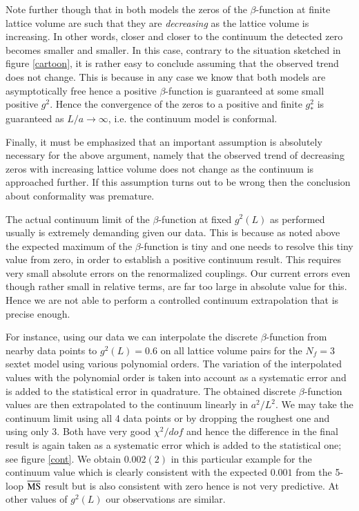 \documentclass[epj]{webofc}
\def\msbar{\overline{\rm MS\kern-0.5pt}\kern0.5pt}
\begin{document}
Note further though that in both models the zeros of the $\beta$-function at finite lattice volume are such that they
are {\em decreasing} as the lattice volume is increasing. In other words, closer and closer to the continuum the
detected zero becomes smaller and smaller. In this case, contrary to the situation sketched in figure \ref{cartoon}, it
is rather easy to conclude assuming that the observed trend does not change. This is because in any case we know that
both models are asymptotically free hence a positive $\beta$-function is guaranteed at some small positive $g^2$. Hence
the convergence of the zeros to a positive and finite $g_*^2$ is guaranteed as $L/a \to \infty$, i.e. the continuum
model is conformal.

Finally, it must be emphasized that an important assumption is absolutely necessary for the above argument, namely that
the observed trend of decreasing zeros with increasing lattice volume does not change as the continuum is approached
further. If this assumption turns out to be wrong then the conclusion about conformality was premature. 

The actual continuum limit of the $\beta$-function at fixed $g^2(L)$ as performed usually is extremely demanding given
our data. This is because as noted above the expected maximum of the $\beta$-function is tiny and one needs to resolve
this tiny value from zero, in order to establish a positive continuum result. This requires very small absolute errors
on the renormalized couplings. Our current errors even though rather small in relative terms, are far too large in
absolute value for this. Hence we are not able to perform a controlled continuum extrapolation that is precise enough. 

For instance, using our data we can interpolate the discrete $\beta$-function from nearby data points 
to $g^2(L) = 0.6$ on all lattice volume pairs for the $N_f = 3$ sextet model using various polynomial orders. The
variation of the interpolated values with the polynomial order is taken into account as a systematic error
and is added to the statistical error in quadrature. The obtained discrete $\beta$-function values are then extrapolated
to the continuum linearly in $a^2/L^2$. 
We may take the continuum limit using all 4 data points or by
dropping the roughest one and using only 3. 
Both have very good $\chi^2/dof$ and hence the difference in the final result
is again taken as a systematic error which is added to the statistical one; see figure \ref{cont}. 
We obtain $0.002(2)$ in this particular
example for the continuum value 
which is clearly consistent with the expected $0.001$ from the 5-loop $\msbar$ result but is also consistent
with zero hence is not very predictive. At other values of $g^2(L)$ our observations are similar.
\end{document}

